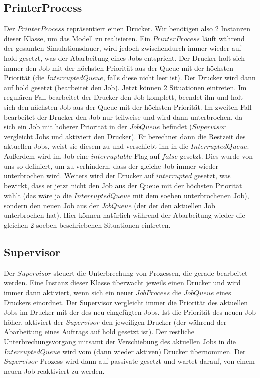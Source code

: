 \documentclass[12pt,a4paper]{article}
\begin{document}
	\subsection{PrinterProcess}
	Der $PrinterProcess$ repräsentiert einen Drucker. Wir benötigen also 2 Instanzen dieser Klasse, um das Modell zu realisieren. Ein $PrinterProcess$ läuft während der gesamten Simulationsdauer, wird
	jedoch zwischendurch immer wieder auf hold gesetzt, was der Abarbeitung eines Jobs entspricht. Der Drucker holt sich immer den Job mit der höchsten Priorität aus der Queue mit der höchsten Priorität (die 
	$InterruptedQueue$, falls diese nicht leer ist). Der Drucker wird dann auf hold gesetzt (bearbeitet den Job). Jetzt können 2 Situationen eintreten. Im regulären Fall bearbeitet der Drucker den Job komplett,
	beendet ihn und holt sich den nächsten Job aus der Queue mit der höchsten Priorität. Im zweiten Fall bearbeitet der Drucker den Job nur teilweise und wird dann unterbrochen, da sich ein Job mit
	höherer Priorität in der $JobQueue$ befindet ($Supervisor$ vergleicht Jobs und aktiviert den Drucker). Er berechnet dann die Restzeit des aktuellen Jobs, weist sie diesem zu und verschiebt ihn in die
	$InterruptedQueue$. Außerdem wird im Job eine $interruptable$-Flag auf $false$ gesetzt. Dies wurde von uns so definiert, um zu verhindern, dass der gleiche Job immer wieder unterbrochen wird. Weiters
	 wird der Drucker auf $interrupted$ gesetzt, was bewirkt, dass er jetzt nicht den Job aus der Queue mit der höchsten Priorität wählt (das wäre ja die $InterruptedQueue$ mit dem soeben unterbrochenen Job),
	 sondern den neuen Job aus der $JobQueue$ (der der den aktuellen Job unterbrochen hat). Hier können natürlich während der Abarbeitung wieder die gleichen 2 soeben beschriebenen Situationen eintreten.
	
	\subsection{Supervisor}
	Der $Supervisor$ steuert die Unterbrechung von Prozessen, die gerade bearbeitet werden. Eine Instanz dieser Klasse überwacht jeweils einen Drucker und wird immer dann aktiviert, wenn sich ein 
	neuer $JobProcess$ die $JobQueue$ eines Druckers einordnet. Der Supervisor vergleicht immer die Priorität des aktuellen Jobs im Drucker mit der des neu eingefügten Jobs. Ist die Priorität des neuen Job
	höher, aktiviert der $Supervisor$ den jeweiligen Drucker (der während der Abarbeitung eines Auftrags auf hold gesetzt ist). Der restliche Unterbrechungsvorgang mitsamt der Verschiebung des aktuellen Jobs
	in die $InterruptedQueue$ wird vom (dann wieder aktiven) Drucker übernommen. Der $Supervisor$-Prozess wird dann auf passivate gesetzt und wartet darauf, von einem neuen Job reaktiviert zu werden.
	
\end{document}

